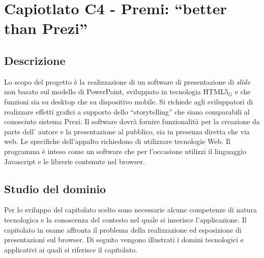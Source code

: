 \section{Capiotlato C4 - Premi: ``better than Prezi''}
\subsection{Descrizione}
Lo scopo del progetto è la realizzazione di un software di presentazione di \textit{slide} non basato sul modello di PowerPoint, sviluppato in tecnologia HTML5$_G$ e che funzioni sia su desktop che su dispositivo mobile. Si richiede agli sviluppatori di realizzare effetti grafici a supporto dello ``storytelling'' che siano comparabili al conosciuto sistema Prezi. Il software dovrà fornire funzionalità per la creazione da parte dell' autore e la presentazione al pubblico, sia in presenza diretta che via web. Le specifiche dell'appalto richiedono di utilizzare tecnologie Web. Il programma è inteso come un software che per l'occasione utilizzi il linguaggio Javascript e le librerie contenute nel browser.

\subsection{Studio del dominio}
Per lo sviluppo del capitolato scelto sono necessarie alcune competenze di natura tecnologica e la conoscenza del contesto nel quale si inserisce l’applicazione. Il capitolato in esame affronta il problema della realizzazione ed esposizione di presentazioni sul browser. Di seguito vengono illustrati i domini tecnologici e applicativi ai quali si riferisce il capitolato.

